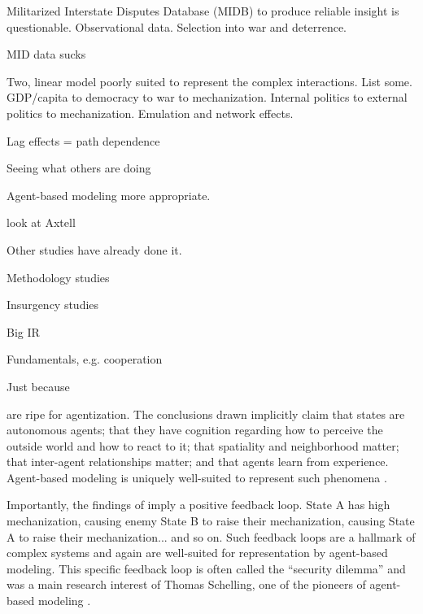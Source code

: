 \documentclass{article}
\begin{document}
Militarized Interstate Disputes Database (MIDB)
\citep{cow_midb}
to produce reliable insight is questionable.
Observational data. Selection into war and deterrence. 

MID data sucks

Two, linear model poorly suited to represent the complex interactions. List
some. GDP/capita to democracy to war to mechanization. Internal politics to
external politics to mechanization. Emulation and network effects.

Lag effects = path dependence

Seeing what others are doing

Agent-based modeling more appropriate.

look at Axtell \citep{axtell2000agents}

Other studies have already done it. 

Methodology studies
\citep{pepinsky2005agents,de2014agent,
gunitsky2013complexity,bousquet2011beyond,
harrison2012complexity,jervis1998system,modelski1990world,modelski1999long,cederman2001agent}

Insurgency studies
\citep{cioffi2010mason,weidmann2013violence,bhavnani2012modeling,bhavnani2014group}

Big IR \citep{cederman2010growing,earnest2008coordination,masad2016dissertation}

Fundamentals, e.g. cooperation \citep{axelrod1981evolution}

Just because \citep{epstein1996growing}

are ripe for agentization. The
conclusions drawn implicitly claim
that states are autonomous agents; that they have
cognition regarding how to perceive the outside world
and how to react to it; that spatiality and
neighborhood matter; that inter-agent relationships matter; and that
agents learn from experience. Agent-based modeling is uniquely well-suited to
represent such phenomena \citep{gilbert2005simulation,miller2009complex}.

Importantly, the findings of \citet{sechser2010army} imply a positive feedback
loop. State A has high
mechanization, causing enemy State B to raise their mechanization, causing State
A to raise their mechanization... and so on. Such feedback loops are a hallmark
of complex systems and again are well-suited for representation by agent-based
modeling. This specific feedback loop is often called
the ``security dilemma'' and was a main research interest of Thomas Schelling, one of the pioneers
of agent-based modeling \citep{schelling1960strategy,schelling2006micromotives}.
\end{document}
